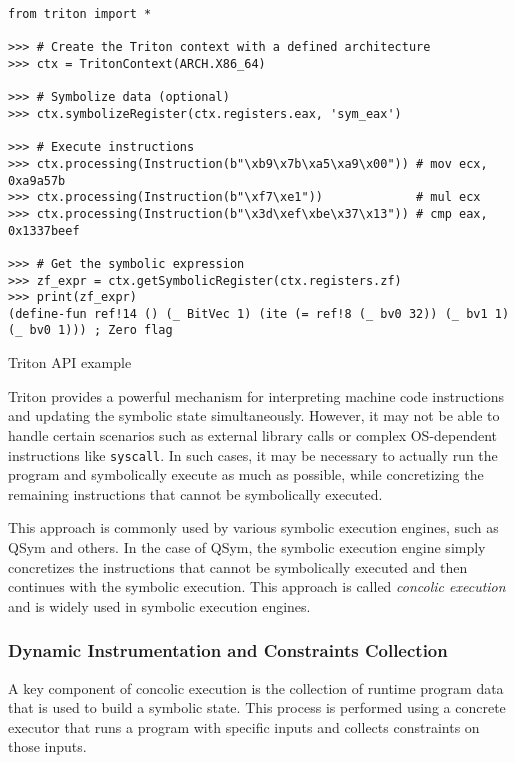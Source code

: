 \begin{listing}[htp]
	\centering
	\begin{minipage}{.9\linewidth}
		\begin{verbatim}
from triton import *

>>> # Create the Triton context with a defined architecture
>>> ctx = TritonContext(ARCH.X86_64)

>>> # Symbolize data (optional)
>>> ctx.symbolizeRegister(ctx.registers.eax, 'sym_eax')

>>> # Execute instructions
>>> ctx.processing(Instruction(b"\xb9\x7b\xa5\xa9\x00")) # mov ecx, 0xa9a57b
>>> ctx.processing(Instruction(b"\xf7\xe1"))             # mul ecx
>>> ctx.processing(Instruction(b"\x3d\xef\xbe\x37\x13")) # cmp eax, 0x1337beef

>>> # Get the symbolic expression
>>> zf_expr = ctx.getSymbolicRegister(ctx.registers.zf)
>>> print(zf_expr)
(define-fun ref!14 () (_ BitVec 1) (ite (= ref!8 (_ bv0 32)) (_ bv1 1) (_ bv0 1))) ; Zero flag
	\end{verbatim}
	\end{minipage}
	\caption{Triton API example}
	\label{lst:example4}
\end{listing}

Triton provides a powerful mechanism for interpreting machine code instructions and updating the symbolic state simultaneously. However, it may not be able to handle certain scenarios such as external library calls or complex OS-dependent instructions like \texttt{syscall}. In such cases, it may be necessary to actually run the program and symbolically execute as much as possible, while concretizing the remaining instructions that cannot be symbolically executed.

This approach is commonly used by various symbolic execution engines, such as QSym \cite{qsym-usenix2018} and others. In the case of QSym, the symbolic execution engine simply concretizes the instructions that cannot be symbolically executed and then continues with the symbolic execution. This approach is called \textit{concolic execution} and is widely used in symbolic execution engines.

\subsubsection{Dynamic Instrumentation and Constraints Collection}

A key component of concolic execution is the collection of runtime program data that is used to build a symbolic state. This process is performed using a concrete executor that runs a program with specific inputs and collects constraints on those inputs.

